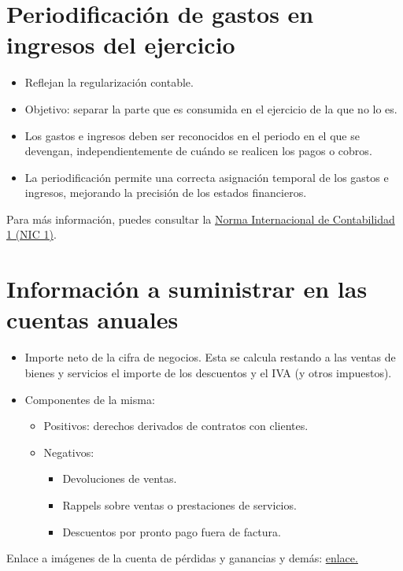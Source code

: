 \documentclass[a4paper,12pt]{article}
\begin{document}
\section{Periodificación de gastos en ingresos del ejercicio}

\begin{itemize}
    \item Reflejan la regularización contable.
    \item Objetivo: separar la parte que es consumida en el ejercicio de la que no lo es.
    \item Los gastos e ingresos deben ser reconocidos en el periodo en el que se devengan, independientemente de cuándo se realicen los pagos o cobros.
    \item La periodificación permite una correcta asignación temporal de los gastos e ingresos, mejorando la precisión de los estados financieros.
\end{itemize}

Para más información, puedes consultar la \href{https://www.ifrs.org/issued-standards/list-of-standards/ias-1-presentation-of-financial-statements/}{Norma Internacional de Contabilidad 1 (NIC 1)}.

\section{Información a suministrar en las cuentas anuales}
\begin{itemize}
    \item Importe neto de la cifra de negocios. Esta se calcula restando a las ventas de bienes y servicios el importe de los descuentos y el IVA (y otros impuestos).
    \item Componentes de la misma:
    \begin{itemize}
        \item Positivos: derechos derivados de contratos con clientes.
        \item Negativos:
        \begin{itemize}
            \item Devoluciones de ventas.
            \item Rappels sobre ventas o prestaciones de servicios.
            \item Descuentos por pronto pago fuera de factura.
        \end{itemize}
    \end{itemize}
\end{itemize}

Enlace a imágenes de la cuenta de pérdidas y ganancias y demás: \href{https://github.com/ElblogdeIsmael/ElblogdeIsmael.github.io/tree/main/Asignaturas/Tercer%20A%C3%B1o/CF1/Resumenes/Tema4/FCCEE/images/figuras}{enlace.}
\end{document}
